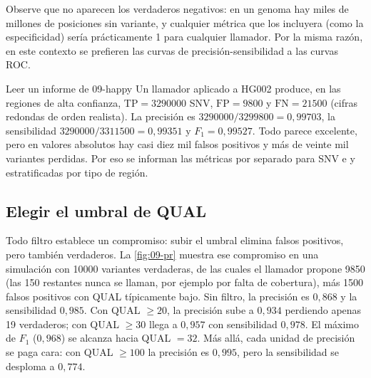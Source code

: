 \begin{simbolos}
\end{simbolos}

Observe que no aparecen los verdaderos negativos: en un genoma hay miles de millones de posiciones sin variante, y cualquier métrica que los incluyera (como la especificidad) sería prácticamente 1 para cualquier llamador. Por la misma razón, en este contexto se prefieren las curvas de precisión-sensibilidad a las curvas ROC.

\begin{ejemplo}{Leer un informe de }{09-happy}
Un llamador aplicado a HG002 produce, en las regiones de alta confianza, $\mathrm{TP}=\num{3290000}$ SNV, $\mathrm{FP}=\num{9800}$ y $\mathrm{FN}=\num{21500}$ (cifras redondas de orden realista). La precisión es $\num{3290000}/\num{3299800}=0{,}99703$, la sensibilidad $\num{3290000}/\num{3311500}=0{,}99351$ y $F_1=0{,}99527$. Todo parece excelente, pero en valores absolutos hay casi diez mil falsos positivos y más de veinte mil variantes perdidas. Por eso se informan las métricas por separado para SNV e  y estratificadas por tipo de región.
\end{ejemplo}

\subsection{Elegir el umbral de QUAL}

Todo filtro establece un compromiso: subir el umbral elimina falsos positivos, pero también verdaderos. La \cref{fig:09-pr} muestra ese compromiso en una simulación con \num{10000} variantes verdaderas, de las cuales el llamador propone \num{9850} (las 150 restantes nunca se llaman, por ejemplo por falta de cobertura), más \num{1500} falsos positivos con QUAL típicamente bajo. Sin filtro, la precisión es $0{,}868$ y la sensibilidad $0{,}985$. Con QUAL $\ge 20$, la precisión sube a $0{,}934$ perdiendo apenas 19 verdaderos; con QUAL $\ge 30$ llega a $0{,}957$ con sensibilidad $0{,}978$. El máximo de $F_1$ ($0{,}968$) se alcanza hacia QUAL $=32$. Más allá, cada unidad de precisión se paga cara: con QUAL $\ge 100$ la precisión es $0{,}995$, pero la sensibilidad se desploma a $0{,}774$.

